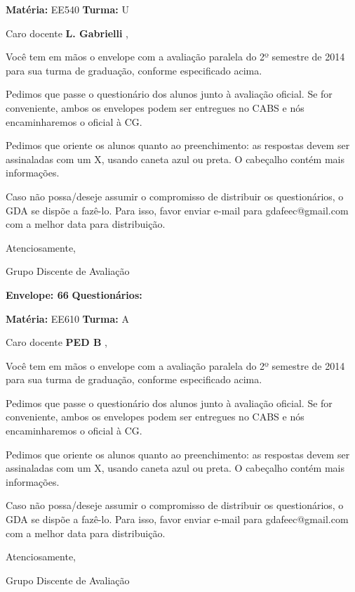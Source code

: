\documentclass[a5paper]{letter}
\begin{document}
\newpage
\thispagestyle{empty}

\hfill {\bf Matéria:} EE540 {\bf Turma:} U

Caro docente {\bf L. Gabrielli }, 

	Você tem em mãos o envelope com a avaliação paralela do 2º semestre de 2014 para sua turma de graduação, conforme especificado acima.

	Pedimos que passe o questionário dos alunos junto à avaliação oficial. Se for conveniente, ambos os envelopes podem ser entregues no CABS e nós encaminharemos o oficial à CG.

Pedimos que oriente os alunos quanto ao preenchimento: as respostas devem ser assinaladas com um X, usando caneta azul ou preta. O cabeçalho contém mais informações.

	Caso não possa/deseje assumir o compromisso de distribuir os questionários, o GDA se dispõe a fazê-lo. Para isso, favor enviar e-mail para gdafeec@gmail.com com a melhor data para distribuição.


Atenciosamente, 

Grupo Discente de Avaliação

\vspace{0.5cm}

{\bf Envelope: 66 }		\hfill	{\bf Questionários:} \hspace{2cm}

\newpage
\thispagestyle{empty}

\hfill {\bf Matéria:} EE610 {\bf Turma:} A

Caro docente {\bf PED B }, 

	Você tem em mãos o envelope com a avaliação paralela do 2º semestre de 2014 para sua turma de graduação, conforme especificado acima.

	Pedimos que passe o questionário dos alunos junto à avaliação oficial. Se for conveniente, ambos os envelopes podem ser entregues no CABS e nós encaminharemos o oficial à CG.

Pedimos que oriente os alunos quanto ao preenchimento: as respostas devem ser assinaladas com um X, usando caneta azul ou preta. O cabeçalho contém mais informações.

	Caso não possa/deseje assumir o compromisso de distribuir os questionários, o GDA se dispõe a fazê-lo. Para isso, favor enviar e-mail para gdafeec@gmail.com com a melhor data para distribuição.


Atenciosamente, 

Grupo Discente de Avaliação
\end{document}
